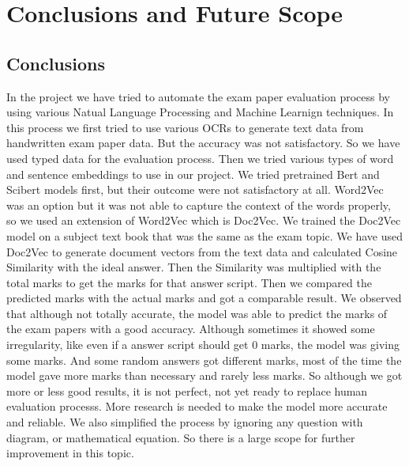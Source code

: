 \chapter{Conclusions and Future Scope }
\label{C5} %

\section{Conclusions}
\par
In the project we have tried to automate the exam paper evaluation process by using various Natual Language Processing and Machine Learnign 
techniques. In this process we first tried to use various OCRs to generate text data from handwritten exam paper data.
But the accuracy was not satisfactory. So we have used typed data for the evaluation process.
Then we tried various types of word and sentence embeddings to use in our project. We tried pretrained Bert and Scibert models first,
but their outcome were not satisfactory at all. Word2Vec was an option but it was not able to capture the context of the words properly, 
so we used an extension of Word2Vec which is Doc2Vec. We trained the Doc2Vec model on a subject text book that was the same as the exam topic. 
We have used Doc2Vec to generate document vectors from the text data and calculated Cosine Similarity with 
the ideal answer. Then the Similarity was multiplied with the total marks to get the marks for that answer script.
Then we compared the predicted marks with the actual marks and got a comparable result. We observed that although not 
totally accurate, the model was able to predict the marks of the exam papers with a good accuracy.
Although sometimes it showed some irregularity, like even if a answer script should get 0 marks, the model was giving some marks.
And some random answers got different marks, most of the time the model gave more marks than necessary and rarely less marks.
So although we got more or less good results, it is not perfect, not yet ready to replace human evaluation processs.
More research is needed to make the model more accurate and reliable. We also simplified the process by ignoring
any question with diagram, or mathematical equation. So there is a large scope for further improvement in this topic.


